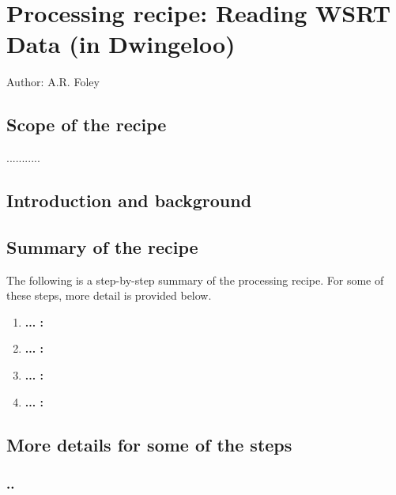 %
%
\chapter{Processing recipe: Reading WSRT Data (in Dwingeloo)}
\tableofcontents 

Author: A.R. Foley

\section{Scope of the recipe}
\label{.scope}

...........


\section{Introduction and background}
\label{.intro}


\section{Summary of the recipe}
\label{.summary}

The following is a step-by-step summary of the processing recipe.
For some of these steps, more detail is provided below.

\begin{enumerate}
\item {\bf ... :}
\item {\bf ... :}
\item {\bf ... :}
\item {\bf ... :}
\end{enumerate}


\section{More details for some of the steps}
\label{.detail}

\subsection{..}
\label{.detail.x}

